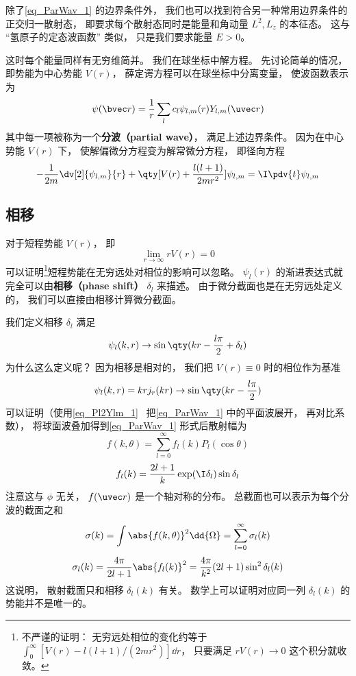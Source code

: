 除了\autoref{eq_ParWav_1} 的边界条件外， 我们也可以找到符合另一种常用边界条件的正交归一散射态， 即要求每个散射态同时是能量和角动量 $L^2, L_z$ 的本征态。 这与 “氢原子的定态波函数” 类似， 只是我们要求能量 $E > 0$。

这时每个能量同样有无穷维简并。 我们在球坐标中解方程。 先讨论简单的情况， 即势能为中心势能 $V(r)$， 薛定谔方程可以在球坐标中分离变量， 使波函数表示为 %
\begin{equation}
\psi(\bvec r) = \frac{1}{r} \sum_l c_l \psi_{l,m}(r) Y_{l,m}(\uvec r)
\end{equation}
其中每一项被称为一个\textbf{分波（partial wave）}， 满足上述边界条件。 因为在中心势能 $V(r)$ 下， 使解偏微分方程变为解常微分方程， 即径向方程 %
\begin{equation}
-\frac{1}{2m} \dv[2]{\psi_{l,m}}{r} + \qty[V(r) + \frac{l(l + 1)}{2mr^2}]\psi_{l,m} = \I \pdv{t} \psi_{l,m}
\end{equation}

\subsection{相移}
对于短程势能 $V(r)$， 即
\begin{equation}
\lim_{r\to\infty} r V(r) = 0
\end{equation}
可以证明\footnote{不严谨的证明： 无穷远处相位的变化约等于 $\int_0^\infty [V(r) - l(l+1)/(2mr^2)]\dd{r}$， 只要满足 $rV(r) \to 0$ 这个积分就收敛。}短程势能在无穷远处对相位的影响可以忽略。 $\psi_l(r)$ 的渐进表达式就完全可以由\textbf{相移（phase shift）} $\delta_l$ 来描述。 由于微分截面也是在无穷远处定义的， 我们可以直接由相移计算微分截面。

我们定义相移 $\delta_l$ 满足
\begin{equation}
\psi_l(k, r) \to \sin\qty(kr - \frac{l\pi}{2} + \delta_l)
\end{equation}
为什么这么定义呢？ 因为相移是相对的， 我们把 $V(r) \equiv 0$ 时的相位作为基准
\begin{equation}
\psi_l(k, r) = kr j_r(kr) \to \sin\qty(kr - \frac{l\pi}{2})
\end{equation}
可以证明（使用\autoref{eq_Pl2Ylm_1}~ 把\autoref{eq_ParWav_1} 中的平面波展开， 再对比系数）， 将球面波叠加得到\autoref{eq_ParWav_1} 形式后散射幅为
\begin{equation}
f(k, \theta) = \sum_{l=0}^\infty f_l(k) P_l(\cos\theta)
\end{equation}
\begin{equation}
f_l(k) = \frac{2l+1}{k} \exp(\I\delta_l) \sin\delta_l
\end{equation}
注意这与 $\phi$ 无关， $f(\uvec r)$ 是一个轴对称的分布。 总截面也可以表示为每个分波的截面之和
\begin{equation}
\sigma(k) = \int \abs{f(k,\theta)}^2 \dd{\Omega} = \sum_{l=0}^\infty \sigma_l(k)
\end{equation}
\begin{equation}
\sigma_l(k) = \frac{4\pi}{2l+1} \abs{f_l(k)}^2 = \frac{4\pi}{k^2} (2l + 1) \sin^2 \delta_l(k)
\end{equation}
这说明， 散射截面只和相移 $\delta_l(k)$ 有关。 数学上可以证明对应同一列 $\delta_l(k)$ 的势能并不是唯一的。

